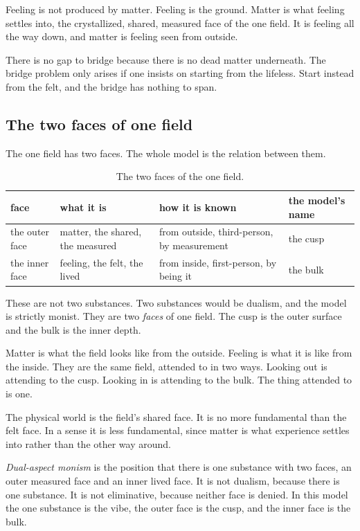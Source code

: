\begin{principle}
Feeling is not produced by matter. Feeling is the ground. Matter is what feeling settles into, the crystallized, shared, measured face of the one field. It is feeling all the way down, and matter is feeling seen from outside.
\end{principle}

There is no gap to bridge because there is no dead matter underneath. The bridge problem only arises if one insists on starting from the lifeless. Start instead from the felt, and the bridge has nothing to span.

\subsection{The two faces of one field}

The one field has two faces. The whole model is the relation between them.

\begin{table}[ht]
\centering
\begin{tabular}{@{}llll@{}}
\toprule
face & what it is & how it is known & the model's name \\
\midrule
the outer face & matter, the shared, the measured & from outside, third-person, by measurement & the cusp \\
the inner face & feeling, the felt, the lived & from inside, first-person, by being it & the bulk \\
\bottomrule
\end{tabular}
\caption{The two faces of the one field.}
\label{tab:two-faces}
\end{table}

These are not two substances. Two substances would be dualism, and the model is strictly monist. They are two \emph{faces} of one field. The cusp is the outer surface and the bulk is the inner depth.

Matter is what the field looks like from the outside. Feeling is what it is like from the inside. They are the same field, attended to in two ways. Looking out is attending to the cusp. Looking in is attending to the bulk. The thing attended to is one.

The physical world is the field's shared face. It is no more fundamental than the felt face. In a sense it is less fundamental, since matter is what experience settles into rather than the other way around.

\begin{definition}
\emph{Dual-aspect monism} is the position that there is one substance with two faces, an outer measured face and an inner lived face. It is not dualism, because there is one substance. It is not eliminative, because neither face is denied. In this model the one substance is the vibe, the outer face is the cusp, and the inner face is the bulk.
\end{definition}

